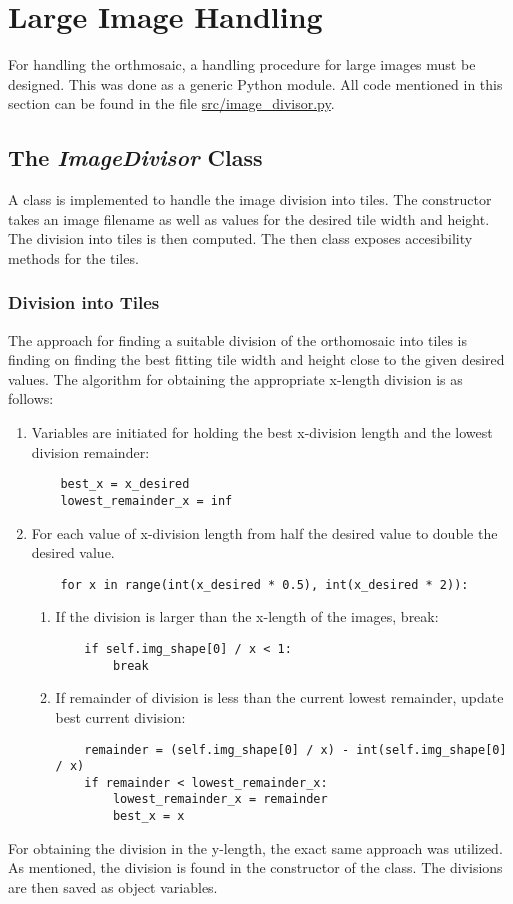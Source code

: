 \documentclass[../Head/Main.tex]{subfiles}
\begin{document}
\section{Large Image Handling}\label{sec:imageHandling}
For handling the orthmosaic, a handling procedure for large images must be designed. This was done as a generic Python module. All code mentioned in this section can be found in the file \url{src/image_divisor.py}.

\subsection{The \textit{ImageDivisor} Class}
A class is implemented to handle the image division into tiles. The constructor takes an image filename as well as values for the desired tile width and height. The division into tiles is then computed. The then class exposes accesibility methods for the tiles.

\subsubsection{Division into Tiles}
The approach for finding a suitable division of the orthomosaic into tiles is finding on finding the best fitting tile width and height close to the given desired values. The algorithm for obtaining the appropriate x-length division is as follows:
\begin{enumerate}
\item Variables are initiated for holding the best x-division length and the lowest division remainder:
\begin{verbatim}
	best_x = x_desired
    lowest_remainder_x = inf
\end{verbatim}
\item For each value of x-division length from half the desired value to double the desired value.
\begin{verbatim}
    for x in range(int(x_desired * 0.5), int(x_desired * 2)):
\end{verbatim}
\begin{enumerate}
\item If the division is larger than the x-length of the images, break:
\begin{verbatim}
    if self.img_shape[0] / x < 1:
        break
\end{verbatim}
\item If remainder of division is less than the current lowest remainder, update best current division:
\begin{verbatim}
    remainder = (self.img_shape[0] / x) - int(self.img_shape[0] / x)
    if remainder < lowest_remainder_x:
        lowest_remainder_x = remainder
        best_x = x
\end{verbatim}
\end{enumerate}
\end{enumerate}
For obtaining the division in the y-length, the exact same approach was utilized. As mentioned, the division is found in the constructor of the class. The divisions are then saved as object variables.
\end{document}

